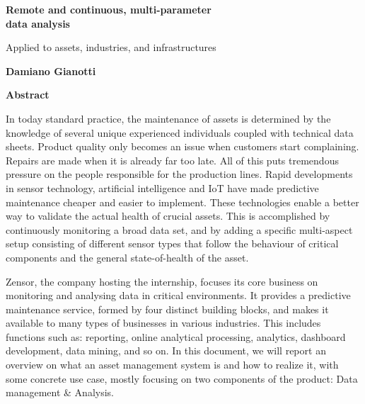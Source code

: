 \begin{center}
    \Large
    \textbf{Remote and continuous, multi-parameter \\ data analysis}
        
    \vspace{0.4cm}
    \large
    Applied to assets, industries, and infrastructures
        
    \vspace{0.4cm}
    \textbf{Damiano Gianotti}
       
    \vspace{0.9cm}
    \textbf{Abstract}
\end{center}
In today standard practice, the maintenance of assets is determined by the knowledge of several unique experienced individuals coupled with technical data sheets.
Product quality only becomes an issue when customers start complaining. Repairs are made when it is already far too late. All of this puts tremendous pressure on the people responsible for the production lines. 
Rapid developments in sensor technology, artificial intelligence and \acl{IoT} have made predictive maintenance cheaper and easier to implement. These technologies enable a better way to validate the actual health of crucial assets. 
This is accomplished by continuously monitoring a broad data set, and by adding a specific multi-aspect setup consisting of different sensor types that follow the behaviour of critical components and the general state-of-health of the asset.

Zensor, the company hosting the internship, focuses its core business on monitoring and analysing data in critical environments. It provides a predictive maintenance service, formed by four distinct building blocks, and makes it available to many types of businesses in various industries. 
This includes functions such as: reporting, online analytical processing, analytics, dashboard development, data mining, and so on.
In this document, we will report an overview on what an asset management system is and how to realize it, with some concrete use case, mostly focusing on two components of the product: Data management \& Analysis.
\cleardoublepage
